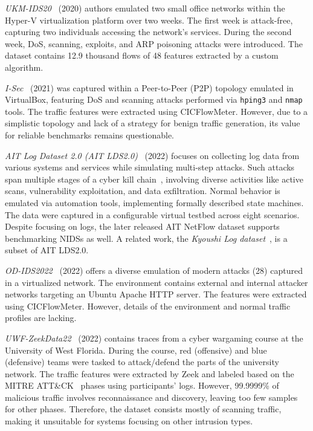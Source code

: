 \emph{UKM-IDS20}~\cite{aldaweri2021_ukmids20} (2020) authors emulated two small office networks within the Hyper-V virtualization platform over two weeks. The first week is attack-free, capturing two individuals accessing the network's services. During the second week, DoS, scanning, exploits, and ARP poisoning attacks were introduced. The dataset contains 12.9 thousand flows of 48 features extracted by a custom algorithm.

\emph{I-Sec}~\cite{serinelli2023_isec_ids_dataset} (2021) was captured within a Peer-to-Peer (P2P) topology emulated in VirtualBox, featuring DoS and scanning attacks performed via \texttt{hping3} and \texttt{nmap} tools. The traffic features were extracted using CICFlowMeter. However, due to a simplistic topology and lack of a strategy for benign traffic generation, its value for reliable benchmarks remains questionable.

\emph{AIT Log Dataset 2.0 (AIT LDS2.0)}~\cite{landauer2023_ait_ldsv2_dataset} (2022) focuses on collecting log data from various systems and services while simulating multi-step attacks. Such attacks span multiple stages of a cyber kill chain~\cite{hutchins2011_cyber_kill_chain}, involving diverse activities like active scans, vulnerability exploitation, and data exfiltration. Normal behavior is emulated via automation tools, implementing formally described state machines. The data were captured in a configurable virtual testbed across eight scenarios. Despite focusing on logs, the later released AIT NetFlow dataset supports benchmarking NIDSs as well. A related work, the \emph{Kyoushi Log dataset}~\cite{landauer2021_kyoushi_dataset}, is a subset of AIT LDS2.0.

\emph{OD-IDS2022}~\cite{patel2023_od_ids2022} (2022) offers a diverse emulation of modern attacks (28) captured in a virtualized network. The environment contains external and internal attacker networks targeting an Ubuntu Apache HTTP server. The features were extracted using CICFlowMeter. However, details of the environment and normal traffic profiles are lacking.

\emph{UWF-ZeekData22}~\cite{bagui2023_uwf_zeekdata22} (2022) contains traces from a cyber wargaming course at the University of West Florida. During the course, red (offensive) and blue (defensive) teams were tasked to attack/defend the parts of the university network. The traffic features were extracted by Zeek and labeled based on the MITRE ATT\&CK~\cite{mitre2024_mitre_attck} phases using participants' logs. However, 99.9999\% of malicious traffic involves reconnaissance and discovery, leaving too few samples for other phases. Therefore, the dataset consists mostly of scanning traffic, making it unsuitable for systems focusing on other intrusion types.

